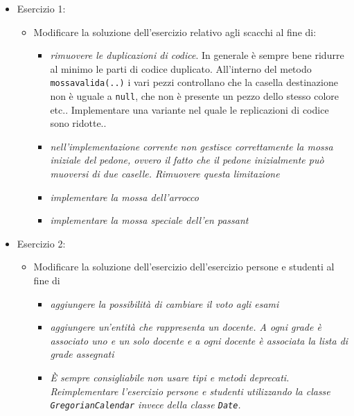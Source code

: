 \documentclass{article}
\begin{document}
\begin{itemize}
\item Esercizio 1:
\begin{itemize}
\item Modificare la soluzione dell'esercizio relativo agli scacchi al fine di:
\begin{itemize}
\item \emph{rimuovere le duplicazioni di codice}. In generale \`e sempre bene ridurre al minimo le parti di codice duplicato. All'interno del metodo \texttt{mossavalida(..)} i vari pezzi controllano che la casella destinazione non \`e uguale a \texttt{null}, che non \`e presente un pezzo dello stesso colore etc.. Implementare una variante nel quale le replicazioni di codice sono ridotte..
\item \emph{nell'implementazione corrente non gestisce correttamente la mossa iniziale del pedone, ovvero il fatto che il pedone inizialmente pu\`o muoversi di due caselle. Rimuovere questa limitazione}
\item \emph{implementare la mossa dell'arrocco}
\item \emph{implementare la mossa speciale dell'en passant}
\end{itemize}
\end{itemize}
\item Esercizio 2:
\begin{itemize}
\item Modificare la soluzione dell'esercizio dell'esercizio persone e studenti al fine di
\begin{itemize}
\item \emph{aggiungere la possibilit\`a di cambiare il voto agli esami}
\item \emph{aggiungere un'entit\`a che rappresenta un docente. A ogni grade \`e associato uno e un solo docente e a ogni docente \`e associata la lista di grade assegnati}
\item \emph{\`E sempre consigliabile non usare tipi e metodi deprecati. Reimplementare l'esercizio persone e studenti utilizzando la classe \texttt{GregorianCalendar} invece della classe \texttt{Date}.}
\end{itemize}
\end{itemize}
\end{itemize}


\clearpage







\nocite{*}
\end{document}
